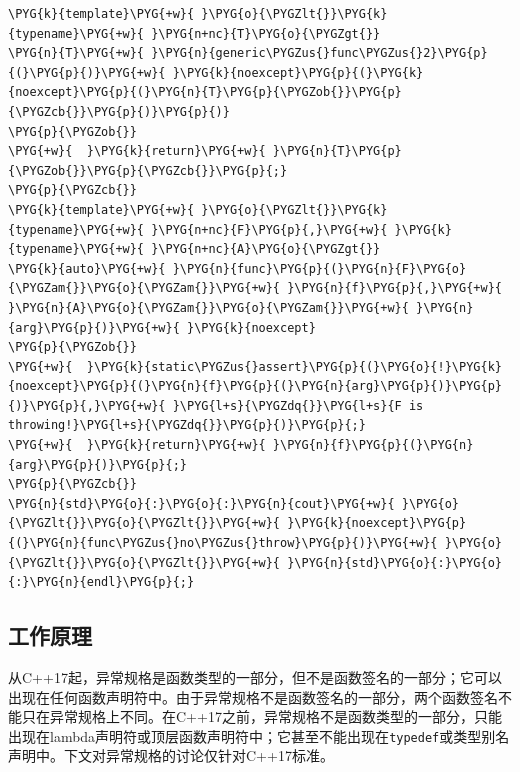 \begin{itemize}
\begin{codeblockbg}
\begin{Verbatim}[commandchars=\\\{\},breaklines=true,breakanywhere=true,fontsize=\codefont,xleftmargin=17bp]
\PYG{k}{template}\PYG{+w}{ }\PYG{o}{\PYGZlt{}}\PYG{k}{typename}\PYG{+w}{ }\PYG{n+nc}{T}\PYG{o}{\PYGZgt{}}
\PYG{n}{T}\PYG{+w}{ }\PYG{n}{generic\PYGZus{}func\PYGZus{}2}\PYG{p}{(}\PYG{p}{)}\PYG{+w}{ }\PYG{k}{noexcept}\PYG{p}{(}\PYG{k}{noexcept}\PYG{p}{(}\PYG{n}{T}\PYG{p}{\PYGZob{}}\PYG{p}{\PYGZcb{}}\PYG{p}{)}\PYG{p}{)}
\PYG{p}{\PYGZob{}}
\PYG{+w}{  }\PYG{k}{return}\PYG{+w}{ }\PYG{n}{T}\PYG{p}{\PYGZob{}}\PYG{p}{\PYGZcb{}}\PYG{p}{;}
\PYG{p}{\PYGZcb{}}
\PYG{k}{template}\PYG{+w}{ }\PYG{o}{\PYGZlt{}}\PYG{k}{typename}\PYG{+w}{ }\PYG{n+nc}{F}\PYG{p}{,}\PYG{+w}{ }\PYG{k}{typename}\PYG{+w}{ }\PYG{n+nc}{A}\PYG{o}{\PYGZgt{}}
\PYG{k}{auto}\PYG{+w}{ }\PYG{n}{func}\PYG{p}{(}\PYG{n}{F}\PYG{o}{\PYGZam{}}\PYG{o}{\PYGZam{}}\PYG{+w}{ }\PYG{n}{f}\PYG{p}{,}\PYG{+w}{ }\PYG{n}{A}\PYG{o}{\PYGZam{}}\PYG{o}{\PYGZam{}}\PYG{+w}{ }\PYG{n}{arg}\PYG{p}{)}\PYG{+w}{ }\PYG{k}{noexcept}
\PYG{p}{\PYGZob{}}
\PYG{+w}{  }\PYG{k}{static\PYGZus{}assert}\PYG{p}{(}\PYG{o}{!}\PYG{k}{noexcept}\PYG{p}{(}\PYG{n}{f}\PYG{p}{(}\PYG{n}{arg}\PYG{p}{)}\PYG{p}{)}\PYG{p}{,}\PYG{+w}{ }\PYG{l+s}{\PYGZdq{}}\PYG{l+s}{F is throwing!}\PYG{l+s}{\PYGZdq{}}\PYG{p}{)}\PYG{p}{;}
\PYG{+w}{  }\PYG{k}{return}\PYG{+w}{ }\PYG{n}{f}\PYG{p}{(}\PYG{n}{arg}\PYG{p}{)}\PYG{p}{;}
\PYG{p}{\PYGZcb{}}
\PYG{n}{std}\PYG{o}{:}\PYG{o}{:}\PYG{n}{cout}\PYG{+w}{ }\PYG{o}{\PYGZlt{}}\PYG{o}{\PYGZlt{}}\PYG{+w}{ }\PYG{k}{noexcept}\PYG{p}{(}\PYG{n}{func\PYGZus{}no\PYGZus{}throw}\PYG{p}{)}\PYG{+w}{ }\PYG{o}{\PYGZlt{}}\PYG{o}{\PYGZlt{}}\PYG{+w}{ }\PYG{n}{std}\PYG{o}{:}\PYG{o}{:}\PYG{n}{endl}\PYG{p}{;}
\end{Verbatim}
\end{codeblockbg}

\end{itemize}



\subsection{工作原理}



从C++17起，异常规格是函数类型的一部分，但不是函数签名的一部分；它可以出现在任何函数声明符中。由于异常规格不是函数签名的一部分，两个函数签名不能只在异常规格上不同。在C++17之前，异常规格不是函数类型的一部分，只能出现在lambda声明符或顶层函数声明符中；它甚至不能出现在\texttt{typedef}或类型别名声明中。下文对异常规格的讨论仅针对C++17标准。



